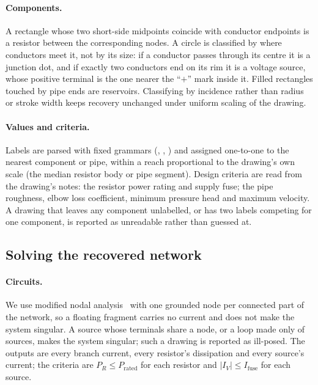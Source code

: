 \paragraph{Components.} A rectangle whose two short-side midpoints coincide with conductor endpoints is a
resistor between the corresponding nodes. A circle is classified by where conductors meet it, not by its size:
if a conductor passes through its centre it is a junction dot, and if exactly two conductors end on its rim it
is a voltage source, whose positive terminal is the one nearer the ``$+$'' mark inside it. Filled rectangles
touched by pipe ends are reservoirs. Classifying by incidence rather than radius or stroke width keeps recovery
unchanged under uniform scaling of the drawing.

\paragraph{Values and criteria.} Labels are parsed with fixed grammars (\eg {},
, ) and assigned one-to-one to the nearest component or pipe,
within a reach proportional to the drawing's own scale (the median resistor body or pipe segment). Design
criteria are read from the drawing's notes: the resistor power rating and supply fuse; the pipe roughness,
elbow loss coefficient, minimum pressure head and maximum velocity. A drawing that leaves any component
unlabelled, or has two labels competing for one component, is reported as unreadable rather than guessed at.

\subsection{Solving the recovered network}
\paragraph{Circuits.} We use modified nodal analysis~\cite{ho1975mna} with one grounded node per connected
part of the network, so a floating fragment carries no current and does not make the system singular. A source
whose terminals share a node, or a loop made only of sources, makes the system singular; such a drawing is
reported as ill-posed. The outputs are every branch current, every resistor's dissipation and every source's
current; the criteria are $P_R \le P_\text{rated}$ for each resistor and $|I_V| \le I_\text{fuse}$ for each
source.

